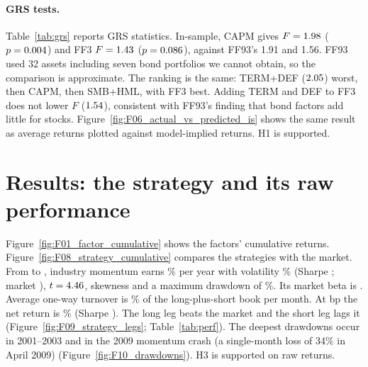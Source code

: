 \documentclass[11pt]{article}
\newcommand{\tabdir}{../results/tables}
\begin{document}
\begin{table}[H]\centering\small
\caption{Cell-by-cell agreement with FF93 (25 portfolios, 1963--1991).}\label{tab:agree}

\end{table}

\paragraph{GRS tests.} Table~\ref{tab:grs} reports GRS statistics. In-sample, CAPM gives $F=1.98$ ($p=0.004$) and FF3 $F=1.43$ ($p=0.086$), against FF93's 1.91 and 1.56. FF93 used 32 assets including seven bond portfolios we cannot obtain, so the comparison is approximate. The ranking is the same: TERM+DEF ($2.05$) worst, then CAPM, then SMB+HML, with FF3 best. Adding TERM and DEF to FF3 does not lower $F$ ($1.54$), consistent with FF93's finding that bond factors add little for stocks. Figure~\ref{fig:F06_actual_vs_predicted_is} shows the same result as average returns plotted against model-implied returns. H1 is supported.

\begin{table}[H]\centering\small
\caption{GRS tests of zero intercepts on the 25 size/BE-ME portfolios. FF93 column: their Table 9c (32 assets).}\label{tab:grs}
\resizebox{\linewidth}{!}{}
\end{table}

\begin{table}[H]\centering\small
\caption{Bond-factor proxies, 1963--1991 (FF93: TERM mean 0.06, SD 3.02; DEF mean 0.02, SD 1.60).}\label{tab:bond}

\end{table}

\section{Results: the strategy and its raw performance}

Figure~\ref{fig:F01_factor_cumulative} shows the factors' cumulative returns. Figure~\ref{fig:F08_strategy_cumulative} compares the strategies with the market. From \StartImom{} to \EndSample, industry momentum earns \ImomMean\% per year with volatility \ImomVol\% (Sharpe \ImomSharpe; market \MktSharpe), $t=4.46$, skewness \ImomSkew{} and a maximum drawdown of \ImomMaxDD\%. Its market beta is \ImomMktBetaCapm. Average one-way turnover is \Turnover\% of the long-plus-short book per month. At \CostBps{} bp the net return is \ImomNetMean\% (Sharpe \ImomNetSharpe). The long leg beats the market and the short leg lags it (Figure~\ref{fig:F09_strategy_legs}; Table~\ref{tab:perf}). The deepest drawdowns occur in 2001--2003 and in the 2009 momentum crash (a single-month loss of 34\% in April 2009) (Figure~\ref{fig:F10_drawdowns}). H3 is supported on raw returns.
\end{document}
